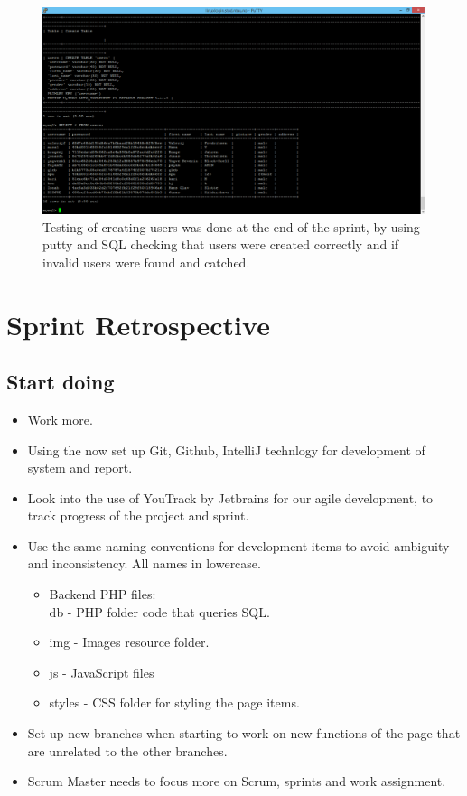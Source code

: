 \begin{figure}[ht!]
\centering
\includegraphics[width={\linewidth}]{Sprint2/img/Sprint2-testing.png}
\caption{ Testing of creating users was done at the end of the sprint, by using putty and SQL checking that users were created correctly and if invalid users were found and catched. \label{overflow}}
\end{figure}

\section{Sprint Retrospective} 

\subsection{Start doing}
\begin{itemize}
\item Work more. 
\item Using the now set up Git, Github, IntelliJ technlogy for development of system and report. 
\item Look into the use of YouTrack by Jetbrains for our agile development, to track progress of the project and sprint. 
\item Use the same naming conventions for development items to avoid ambiguity and inconsistency. All names in lowercase. 
\begin{itemize}
\item Backend PHP files: \\ db - PHP folder code that queries SQL. 
\item img - Images resource folder. 
\item js - JavaScript files
\item styles - CSS folder for styling the page items. 
\end{itemize}
\item Set up new branches when starting to work on new functions of the page that are unrelated to the other branches. 
\item Scrum Master needs to focus more on Scrum, sprints and work assignment. \\
\end{itemize}

